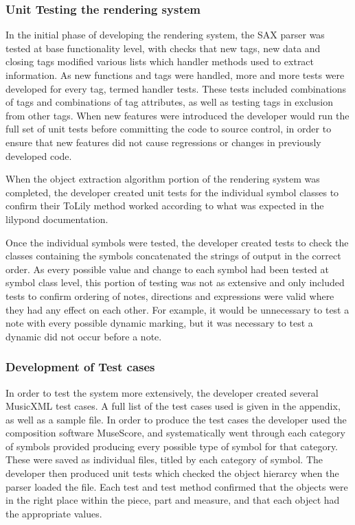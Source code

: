 \subsubsection{Unit Testing the rendering system}
In the initial phase of developing the rendering system, the SAX parser was tested at base functionality level, with checks that new tags, new data and closing tags modified various lists which handler methods used to extract information. As new functions and tags were handled, more and more tests were developed for every tag, termed handler tests. These tests included combinations of tags and combinations of tag attributes, as well as testing tags in exclusion from other tags. When new features were introduced the developer would run the full set of unit tests before committing the code to source control, in order to ensure that new features did not cause regressions or changes in previously developed code.

When the object extraction algorithm portion of the rendering system was completed, the developer created unit tests for the individual symbol classes to confirm their ToLily method worked according to what was expected in the lilypond documentation.

Once the individual symbols were tested, the developer created tests to check the classes containing the symbols concatenated the strings of output in the correct order. As every possible value and change to each symbol had been tested at symbol class level, this portion of testing was not as extensive and only included tests to confirm ordering of notes, directions and expressions were valid where they had any effect on each other. For example, it would be unnecessary to test a note with every possible dynamic marking, but it was necessary to test a dynamic did not occur before a note.


\subsubsection{Development of Test cases}
In order to test the system more extensively, the developer created several MusicXML test cases. A full list of the test cases used is given in the appendix, as well as a sample file. In order to produce the test cases the developer used the composition software MuseScore, and systematically went through each category of symbols provided producing every possible type of symbol for that category. These were saved as individual files, titled by each category of symbol.
The developer then produced unit tests which checked the object hierarcy when the parser loaded the file. Each test and test method confirmed that the objects were in the right place within the piece, part and measure, and that each object had the appropriate values.

